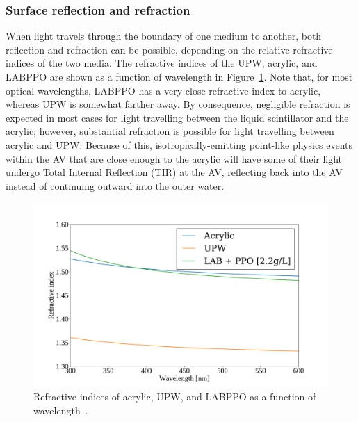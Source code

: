\subsubsection{Surface reflection and refraction}
When light travels through the boundary of one medium to another, both reflection and refraction can be possible, depending on the relative refractive indices of the two media. The refractive indices of the UPW, acrylic, and LABPPO are shown as a function of wavelength in Figure~\ref{fig:ref_indices_snoplus}. Note that, for most optical wavelengths, LABPPO has a very close refractive index to acrylic, whereas UPW is somewhat farther away. By consequence, negligible refraction is expected in most cases for light travelling between the liquid scintillator and the acrylic; however, substantial refraction is possible for light travelling between acrylic and UPW. Because of this, isotropically-emitting point-like physics events within the AV that are close enough to the acrylic will have some of their light undergo Total Internal Reflection (TIR) at the AV, reflecting back into the AV instead of continuing outward into the outer water.

\begin{figure}
    \centering
    \includegraphics[width=0.8\linewidth]{2_Detector/Figs/refractive_indices_plot.pdf}
    \caption[Refractive indices of acrylic, UPW, and LABPPO as a function of wavelength]
    {Refractive indices of acrylic, UPW, and LABPPO as a function of wavelength~\cite{}. %
    }
    \label{fig:ref_indices_snoplus}
\end{figure}

